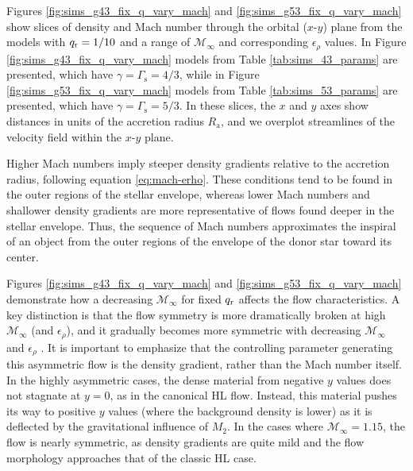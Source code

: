 Figures \ref{fig:sims_g43_fix_q_vary_mach} and \ref{fig:sims_g53_fix_q_vary_mach} show slices of density and Mach number through the orbital ($x$-$y$) plane from the models with $q_{\rm r} = 1/10$ and a range of $\mathcal{M}_\infty$ and corresponding $\epsilon_\rho$ values. In Figure \ref{fig:sims_g43_fix_q_vary_mach} models from Table \ref{tab:sims_43_params} are presented, which have $\gamma = \Gamma_{\mathrm s} = 4/3$, while in Figure \ref{fig:sims_g53_fix_q_vary_mach} models from Table \ref{tab:sims_53_params} are presented, which have $\gamma = \Gamma_{\mathrm s} = 5/3$. In these slices, the $x$ and $y$ axes show distances in units of the accretion radius $R_{\mathrm{a}}$, and we overplot streamlines of the velocity field within the $x$-$y$ plane. 


Higher Mach numbers imply steeper density gradients relative to the accretion radius, following equation \eqref{eq:mach-erho}.  These conditions tend to be found in the outer regions of the stellar envelope, whereas lower Mach numbers and shallower density gradients are more representative of flows found deeper in the stellar envelope. Thus, the sequence of Mach numbers approximates the inspiral of an object from the outer regions of the envelope of the donor star toward its center.


Figures \ref{fig:sims_g43_fix_q_vary_mach} and \ref{fig:sims_g53_fix_q_vary_mach} demonstrate how a decreasing $\mathcal{M}_\infty$ for fixed $q_{\rm r}$ affects the flow characteristics. A key distinction is that the flow symmetry is more dramatically broken at high $\mathcal{M}_\infty$ (and $\epsilon_{\rho}$), and it gradually becomes more symmetric with decreasing $\mathcal{M}_\infty$ and $\epsilon_{\rho}$ \cite{MacLeod_2015,MacLeod:2017}. It is important to emphasize that the controlling parameter generating this asymmetric flow is the density gradient, rather than the Mach number itself. In the highly asymmetric cases, the dense material from negative $y$ values does not stagnate at $y=0$, as in the canonical HL flow. Instead, this material pushes its way to positive $y$ values (where the background density is lower) as it is deflected by the gravitational influence of $M_2$. In the cases where  $\mathcal{M}_\infty = 1.15$, the flow is nearly symmetric, as density gradients are quite mild and the flow morphology approaches that of the classic HL case.


